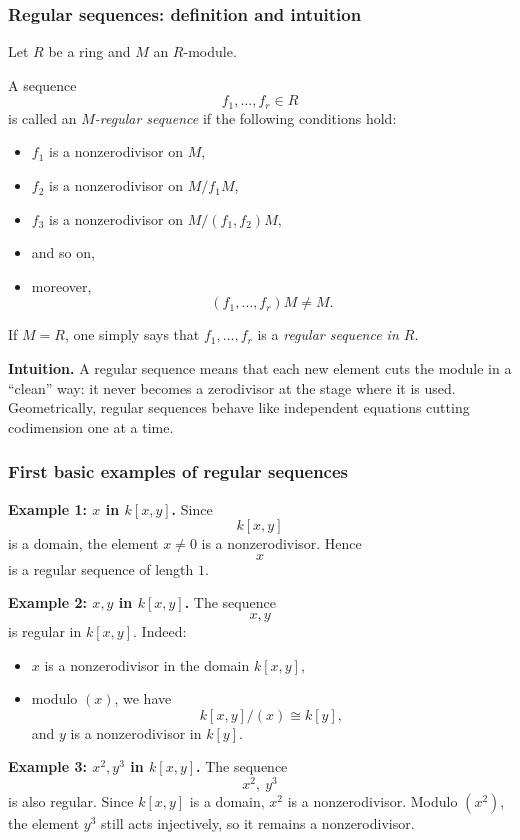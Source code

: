 \documentclass[12pt,a4paper]{article}
\theoremstyle{notespace}
\begin{document}
\subsubsection{Regular sequences: definition and intuition}

Let \(R\) be a ring and \(M\) an \(R\)-module.

A sequence
\[
f_1,\dots,f_r\in R
\]
is called an \emph{\(M\)-regular sequence} if the following conditions hold:
\begin{itemize}
	\item \(f_1\) is a nonzerodivisor on \(M\),
	\item \(f_2\) is a nonzerodivisor on \(M/f_1M\),
	\item \(f_3\) is a nonzerodivisor on \(M/(f_1,f_2)M\),
	\item and so on,
	\item moreover,
	\[
	(f_1,\dots,f_r)M\neq M.
	\]
\end{itemize}

If \(M=R\), one simply says that \(f_1,\dots,f_r\) is a \emph{regular sequence in \(R\)}.

\medskip

\textbf{Intuition.}
A regular sequence means that each new element cuts the module in a ``clean'' way: it never becomes a zerodivisor at the stage where it is used. Geometrically, regular sequences behave like independent equations cutting codimension one at a time.

\subsubsection{First basic examples of regular sequences}

\textbf{Example 1: \(x\) in \(k[x,y]\).}
Since
\[
k[x,y]
\]
is a domain, the element \(x\neq 0\) is a nonzerodivisor. Hence
\[
x
\]
is a regular sequence of length \(1\).

\medskip

\textbf{Example 2: \(x,y\) in \(k[x,y]\).}
The sequence
\[
x,y
\]
is regular in \(k[x,y]\). Indeed:
\begin{itemize}
	\item \(x\) is a nonzerodivisor in the domain \(k[x,y]\),
	\item modulo \((x)\), we have
	\[
	k[x,y]/(x)\cong k[y],
	\]
	and \(y\) is a nonzerodivisor in \(k[y]\).
\end{itemize}

\medskip

\textbf{Example 3: \(x^2,y^3\) in \(k[x,y]\).}
The sequence
\[
x^2,\ y^3
\]
is also regular. Since \(k[x,y]\) is a domain, \(x^2\) is a nonzerodivisor. Modulo \((x^2)\), the element \(y^3\) still acts injectively, so it remains a nonzerodivisor.
\end{document}
